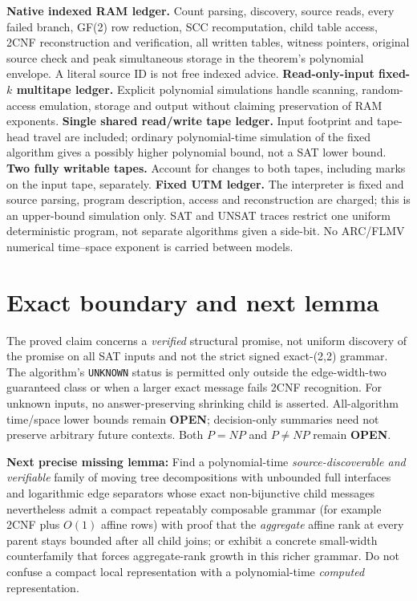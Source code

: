 \documentclass[11pt]{article}
\begin{document}
\textbf{Native indexed RAM ledger.} Count parsing, discovery, source reads, every failed branch, GF(2) row reduction, SCC recomputation, child table access, 2CNF reconstruction and verification, all written tables, witness pointers, original source check and peak simultaneous storage in the theorem's polynomial envelope.  A literal source ID is not free indexed advice.  \textbf{Read-only-input fixed-$k$ multitape ledger.} Explicit polynomial simulations handle scanning, random-access emulation, storage and output without claiming preservation of RAM exponents.  \textbf{Single shared read/write tape ledger.} Input footprint and tape-head travel are included; ordinary polynomial-time simulation of the fixed algorithm gives a possibly higher polynomial bound, not a SAT lower bound.  \textbf{Two fully writable tapes.} Account for changes to both tapes, including marks on the input tape, separately.  \textbf{Fixed UTM ledger.} The interpreter is fixed and source parsing, program description, access and reconstruction are charged; this is an upper-bound simulation only.  SAT and UNSAT traces restrict one uniform deterministic program, not separate algorithms given a side-bit.  No ARC/FLMV numerical time--space exponent is carried between models.

\section{Exact boundary and next lemma}
The proved claim concerns a \emph{verified} structural promise, not uniform discovery of the promise on all SAT inputs and not the strict signed exact-(2,2) grammar.  The algorithm's \texttt{UNKNOWN} status is permitted only outside the edge-width-two guaranteed class or when a larger exact message fails 2CNF recognition.  For unknown inputs, no answer-preserving shrinking child is asserted.  All-algorithm time/space lower bounds remain \textbf{OPEN}; decision-only summaries need not preserve arbitrary future contexts.  Both $P=NP$ and $P\ne NP$ remain \textbf{OPEN}.

\textbf{Next precise missing lemma:} Find a polynomial-time \emph{source-discoverable and verifiable} family of moving tree decompositions with unbounded full interfaces and logarithmic edge separators whose exact non-bijunctive child messages nevertheless admit a compact repeatably composable grammar (for example 2CNF plus $O(1)$ affine rows) with proof that the \emph{aggregate} affine rank at every parent stays bounded after all child joins; or exhibit a concrete small-width counterfamily that forces aggregate-rank growth in this richer grammar.  Do not confuse a compact local representation with a polynomial-time \emph{computed} representation.
\end{document}
